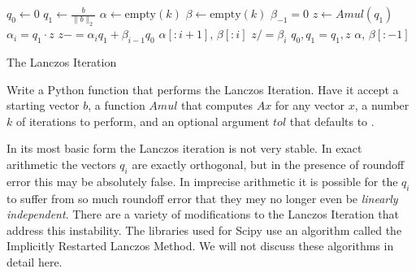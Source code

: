 \begin{algorithm}
\begin{algorithmic}[1]
	\State $q_0 \gets 0$								
	\State $q_1 \gets \frac{b}{\|b\|_2}$
	\State $\alpha \gets \text{empty}\left(k\right)$
	\State $\beta \gets \text{empty}\left(k\right)$
	\State $\beta_{-1} = 0$
										
		\State $z \gets Amul\left(q_1\right)$					
		\State $\alpha_i = q_1 \cdot z$						
		\State $z -= \alpha_i q_1 + \beta_{i-1} q_0$				
										
			\State {} $\alpha [: i+1]$, $\beta [: i]$
		\EndIf
		\State $z /= \beta_i$
		\State $q_0, q_1 = q_1, z$						
	\EndFor
	\State {} $\alpha$, $\beta [: -1]$
\EndProcedure
\end{algorithmic}
\caption{The Lanczos Iteration}
\label{alg:lanczos_iteration}
\end{algorithm}

\begin{problem}
\label{prob:lanczos}
Write a Python function that performs the Lanczos Iteration.
Have it accept a starting vector $b$, a function $Amul$ that computes $A x$ for any vector $x$, a number $k$ of iterations to perform, and an optional argument $tol$ that defaults to .
\end{problem}

In its most basic form the Lanczos iteration is not very stable.
In exact arithmetic the vectors $q_i$ are exactly orthogonal, but in the presence of roundoff error this may be absolutely false.
In imprecise arithmetic it is possible for the $q_i$ to suffer from so much roundoff error that they mey no longer even be \textit{linearly independent}.
There are a variety of modifications to the Lanczos Iteration that address this instability.
The libraries used for Scipy use an algorithm called the Implicitly Restarted Lanczos Method.
We will not discuss these algorithms in detail here.


